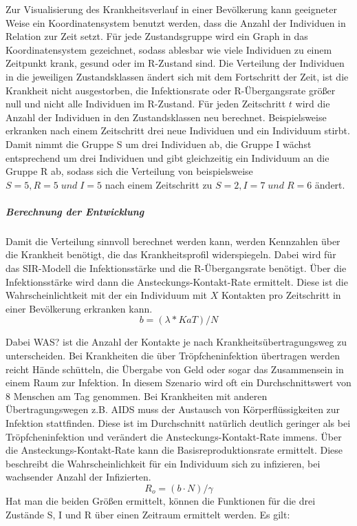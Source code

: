 Zur Visualisierung des Krankheitsverlauf in einer Bevölkerung kann geeigneter Weise ein Koordinatensystem benutzt werden, dass die Anzahl der Individuen in Relation zur Zeit setzt.
Für jede Zustandsgruppe wird ein Graph in das Koordinatensystem gezeichnet, sodass ablesbar wie viele Individuen zu einem Zeitpunkt krank, gesund oder im \glqq R\grqq-Zustand sind.
Die Verteilung der Individuen in die jeweiligen Zustandsklassen ändert sich mit dem Fortschritt der Zeit, ist die Krankheit nicht ausgestorben, die Infektionsrate oder \glqq R\grqq-Übergangsrate größer null und nicht alle Individuen im \glqq R\grqq-Zustand.
Für jeden Zeitschritt $ t $ wird die Anzahl der Individuen in den Zustandsklassen neu berechnet.
Beispielsweise erkranken nach einem Zeitschritt drei neue Individuen und ein Individuum stirbt. Damit nimmt die Gruppe S um drei Individuen ab, die Gruppe I wächst entsprechend um drei Individuen und gibt gleichzeitig ein Individuum an die Gruppe R ab, sodass sich die Verteilung von beispielsweise $ S = 5, R = 5 \; und\; I = 5 $ nach einem Zeitschritt zu $ S = 2, I = 7\; und\; R = 6 $ ändert.


\subparagraph{Berechnung der Entwicklung}
Damit die Verteilung sinnvoll berechnet werden kann, werden Kennzahlen über die Krankheit benötigt, die das Krankheitsprofil widerspiegeln. Dabei wird für das SIR-Modell die Infektionsstärke und die \glqq R\grqq-Übergangsrate benötigt.
Über die Infektionsstärke wird dann die Ansteckungs-Kontakt-Rate ermittelt. Diese ist die Wahrscheinlichtkeit mit der ein Individuum mit $ X $ Kontakten pro Zeitschritt in einer Bevölkerung erkranken kann.
\begin{equation}
 b = (\lambda * KaT) / N 
\end{equation}

 
Dabei WAS? ist die Anzahl der Kontakte je nach Krankheitsübertragungsweg zu unterscheiden. Bei Krankheiten die über Tröpfcheninfektion übertragen werden reicht Hände schütteln, die Übergabe von Geld oder sogar das Zusammensein in einem Raum zur Infektion. In diesem Szenario wird oft ein Durchschnittswert von 8 Menschen am Tag genommen. Bei Krankheiten mit anderen Übertragungswegen z.B. AIDS muss der Austausch von Körperflüssigkeiten zur Infektion stattfinden. Diese ist im Durchschnitt natürlich deutlich geringer als bei Tröpfcheninfektion und verändert die Ansteckungs-Kontakt-Rate immens.
Über die Ansteckungs-Kontakt-Rate kann die Basisreproduktionsrate ermittelt. Diese beschreibt die Wahrscheinlichkeit für ein Individuum sich zu infizieren, bei wachsender Anzahl der Infizierten.
\begin{equation}
 R_o = ( b \cdot N ) / \gamma 
\end{equation}
Hat man die beiden Größen ermittelt, können die Funktionen für die drei Zustände S, I und R über einen Zeitraum ermittelt werden. 
Es gilt:

